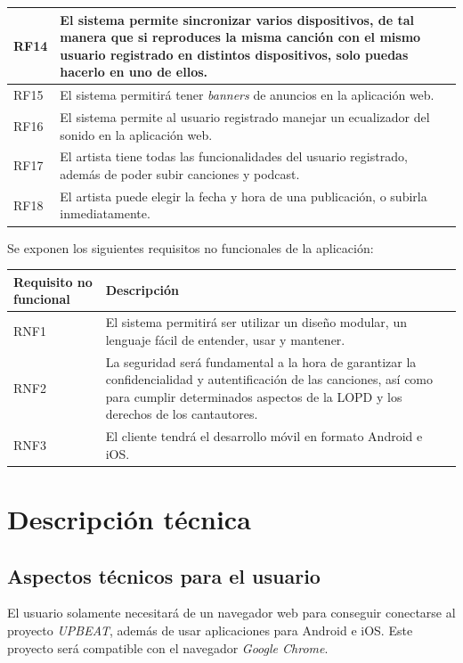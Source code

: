 \documentclass{article}
\begin{document}
\begin{table}[H]
\begin{tabular}{p{4cm} p{10cm}}
		\hline
		RF14
		&  El sistema permite sincronizar varios dispositivos, de tal manera que si reproduces la misma canción con el mismo usuario registrado en distintos dispositivos, solo puedas hacerlo en uno de ellos.\\
		\hline
		RF15
		&  El sistema permitirá tener \textit{banners} de anuncios en la aplicación web.\\
		\hline
		RF16
		& El sistema permite al usuario registrado manejar un ecualizador del sonido en la aplicación web. \\ 
		\hline
		RF17
		& El artista tiene todas las funcionalidades del usuario registrado, además de poder subir canciones y podcast. \\ 
		\hline
		RF18
		& El artista puede elegir la fecha y hora de una publicación, o subirla inmediatamente. \\ 
		\hline
	\end{tabular}
\end{table}
\break
Se exponen los siguientes requisitos no funcionales de la aplicación:

\begin{table}[H]
	\begin{tabular}{p{4cm} p{10cm}}
		\hline
		\hline 
		\textbf{Requisito no funcional} & \textbf{Descripción} \\ 
		\hline
		\hline
		RNF1 
		&  El sistema permitirá ser utilizar un diseño modular, un lenguaje fácil de entender, usar y mantener.\\ 
		\hline
		RNF2
		&  La seguridad será fundamental a la hora de garantizar la confidencialidad y autentificación de las canciones, así como para cumplir determinados aspectos de la LOPD y los derechos de los cantautores.\\ 
		\hline
		RNF3
		&  El cliente tendrá el desarrollo móvil en formato Android e iOS.\\ 
		\hline
	\end{tabular}
\end{table}
\newpage

\section{Descripción técnica}

\subsection{Aspectos técnicos para el usuario}
El usuario solamente necesitará de un navegador web para conseguir conectarse al proyecto \textit{UPBEAT}, además de usar aplicaciones para Android e iOS.
Este proyecto será compatible con el navegador \textit{Google Chrome}.\vspace{0.5cm}
\hfill\break
\begin{figure}[H]

\end{figure}
\end{document}
